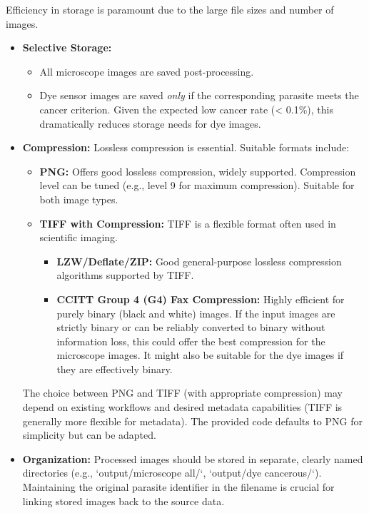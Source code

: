 \documentclass{article}
\begin{document}
Efficiency in storage is paramount due to the large file sizes and number of images.
\begin{itemize}
    \item \textbf{Selective Storage:}
        \begin{itemize}
            \item All microscope images are saved post-processing.
            \item Dye sensor images are saved \textit{only} if the corresponding parasite meets the cancer criterion. Given the expected low cancer rate (< 0.1\%), this dramatically reduces storage needs for dye images.
        \end{itemize}
    \item \textbf{Compression:} Lossless compression is essential. Suitable formats include:
        \begin{itemize}
            \item \textbf{PNG:} Offers good lossless compression, widely supported. Compression level can be tuned (e.g., level 9 for maximum compression). Suitable for both image types.
            \item \textbf{TIFF with Compression:} TIFF is a flexible format often used in scientific imaging.
                \begin{itemize}
                    \item \textbf{LZW/Deflate/ZIP:} Good general-purpose lossless compression algorithms supported by TIFF.
                    \item \textbf{CCITT Group 4 (G4) Fax Compression:} Highly efficient for purely binary (black and white) images. If the input images are strictly binary or can be reliably converted to binary without information loss, this could offer the best compression for the microscope images. It might also be suitable for the dye images if they are effectively binary.
                \end{itemize}
        \end{itemize}
    The choice between PNG and TIFF (with appropriate compression) may depend on existing workflows and desired metadata capabilities (TIFF is generally more flexible for metadata). The provided code defaults to PNG for simplicity but can be adapted.
    \item \textbf{Organization:} Processed images should be stored in separate, clearly named directories (e.g., `output/microscope all/`, `output/dye cancerous/`). Maintaining the original parasite identifier in the filename is crucial for linking stored images back to the source data.
\end{itemize}
\end{document}
